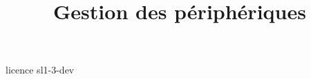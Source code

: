 \documentclass [xcolor=table] {beamer}
\title {Gestion des périphériques}
\begin{document}
 {licence}
 {sl1-3-dev}
\end{document}
